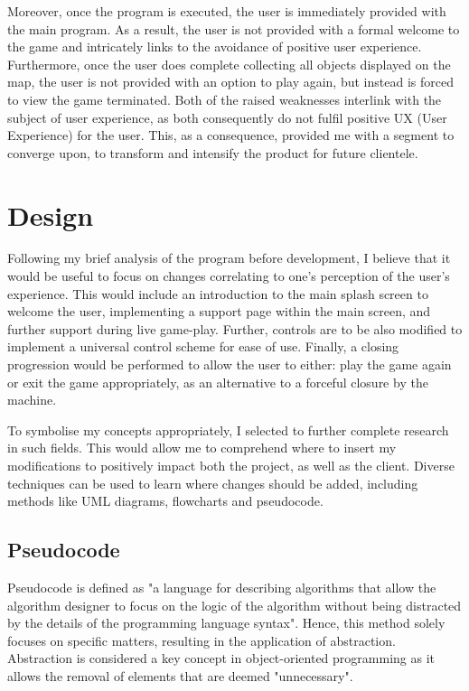 \documentclass{article}
\begin{document}
Moreover, once the program is executed, the user is immediately provided with the main program. As a result, the user is not provided with a formal welcome to the game and intricately links to the avoidance of positive user experience. Furthermore, once the user does complete collecting all objects displayed on the map, the user is not provided with an option to play again, but instead is forced to view the game terminated. Both of the raised weaknesses interlink with the subject of user experience, as both consequently do not fulfil positive UX (User Experience) for the user. This, as a consequence, provided me with a segment to converge upon, to transform and intensify the product for future clientele.




\section{Design}\label{sec:design}
Following my brief analysis of the program before development, I believe that it would be useful to focus on changes correlating to one's perception of the user's experience. This would include an introduction to the main splash screen to welcome the user, implementing a support page within the main screen, and further support during live game-play. Further, controls are to be also modified to implement a universal control scheme for ease of use. Finally, a closing progression would be performed to allow the user to either: play the game again or exit the game appropriately, as an alternative to a forceful closure by the machine.

To symbolise my concepts appropriately, I selected to further complete research in such fields. This would allow me to comprehend where to insert my modifications to positively impact both the project, as well as the client. Diverse techniques can be used to learn where changes should be added, including methods like UML diagrams, flowcharts and pseudocode.

\subsection{Pseudocode}\label{sec:pseudocode}
Pseudocode is defined as "a language for describing algorithms that allow the algorithm designer to focus on the logic of the algorithm without being distracted by the details of the programming language syntax". \cite{pseudo} Hence, this method solely focuses on specific matters, resulting in the application of abstraction. Abstraction is considered a key concept in object-oriented programming as it allows the removal of elements that are deemed "unnecessary". \cite{Abstraction}
\end{document}

